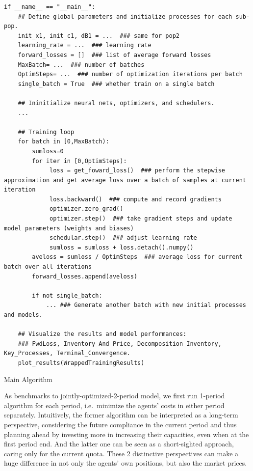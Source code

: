 \documentclass[a4paper,10pt]{article}
\newcommand{\1}{\mathbf{1}}
\begin{document}
\begin{algorithm}[h]
\begin{verbatim}
if __name__ == "__main__":
    ## Define global parameters and initialize processes for each sub-pop. 
    init_x1, init_c1, dB1 = ...  ### same for pop2
    learning_rate = ...  ### learning rate
    forward_losses = []  ### list of average forward losses
    MaxBatch= ...  ### number of batches
    OptimSteps= ...  ### number of optimization iterations per batch
    single_batch = True  ### whether train on a single batch 

    ## Ininitialize neural nets, optimizers, and schedulers.
    ...

    ## Training loop
    for batch in [0,MaxBatch):
        sumloss=0
        for iter in [0,OptimSteps):
             loss = get_foward_loss()  ### perform the stepwise approximation and get average loss over a batch of samples at current iteration
             loss.backward()  ### compute and record gradients
             optimizer.zero_grad()  
             optimizer.step()  ### take gradient steps and update model parameters (weights and biases)
             schedular.step()  ### adjust learning rate
             sumloss = sumloss + loss.detach().numpy() 
        aveloss = sumloss / OptimSteps  ### average loss for current batch over all iterations
        forward_losses.append(aveloss)
    
        if not single_batch:
            ... ### Generate another batch with new initial processes and models. 
    
    ## Visualize the results and model performances:
    ### FwdLoss, Inventory_And_Price, Decomposition_Inventory, Key_Processes, Terminal_Convergence.
    plot_results(WrappedTrainingResults)
\end{verbatim}
\caption{Main Algorithm}\label{alg:main-alg}
\end{algorithm}


As benchmarks to jointly-optimized-2-period model, we first run 1-period
algorithm for each period, i.e.~minimize the agents' costs in either
period separately. Intuitively, the former algorithm can be interpreted
as a long-term perspective, considering the future compliance in the
current period and thus planning ahead by investing more in increasing
their capacities, even when at the first period end. And the latter one
can be seen as a short-sighted approach, caring only for the current
quota. These 2 distinctive perspectives can make a huge difference in
not only the agents' own positions, but also the market prices.
\end{document}
